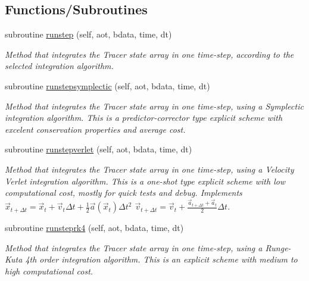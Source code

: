 \subsection*{Functions/\+Subroutines}
\begin{DoxyCompactItemize}
\item 
subroutine \mbox{\hyperlink{namespacesolver__mod_ab87d71c6c8aa1709901ec14f9bf12505}{runstep}} (self, aot, bdata, time, dt)
\begin{DoxyCompactList}\small\item\em Method that integrates the Tracer state array in one time-\/step, according to the selected integration algorithm. \end{DoxyCompactList}\item 
subroutine \mbox{\hyperlink{namespacesolver__mod_a91ddfd70d0f6d65b00fe6b08f4113cd6}{runstepsymplectic}} (self, aot, bdata, time, dt)
\begin{DoxyCompactList}\small\item\em Method that integrates the Tracer state array in one time-\/step, using a Symplectic integration algorithm. This is a predictor-\/corrector type explicit scheme with excelent conservation properties and average cost. \end{DoxyCompactList}\item 
subroutine \mbox{\hyperlink{namespacesolver__mod_acf893016edd8e0eb4bc77666aed1096f}{runstepverlet}} (self, aot, bdata, time, dt)
\begin{DoxyCompactList}\small\item\em Method that integrates the Tracer state array in one time-\/step, using a Velocity Verlet integration algorithm. This is a one-\/shot type explicit scheme with low computational cost, mostly for quick tests and debug. Implements $ {\vec {x}}_{t+\Delta t}={\vec {x}}_{t}+{\vec {v}}_{t}\Delta t+{\frac {1}{2}}{\vec {a}}({\vec {x}}_{t})\Delta t^{2}$ $ {\vec {v}}_{t+\Delta t}={\vec {v}}_{t}+\frac{{\vec {a}}_{t+\Delta t}+{\vec {a}}_{t}}{2}\Delta t$. \end{DoxyCompactList}\item 
subroutine \mbox{\hyperlink{namespacesolver__mod_ae59da54f053ae369d76f130b3790f3b7}{runsteprk4}} (self, aot, bdata, time, dt)
\begin{DoxyCompactList}\small\item\em Method that integrates the Tracer state array in one time-\/step, using a Runge-\/\+Kuta 4th order integration algorithm. This is an explicit scheme with medium to high computational cost. \end{DoxyCompactList}\item 

\end{DoxyCompactItemize}
